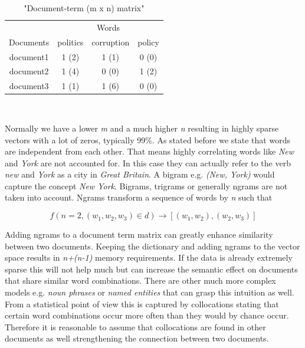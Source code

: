     \begin{table}[h!]
      \centering
      \begin{tabular}{c|c|c|c}
        \multicolumn{1}{r|}{} & \multicolumn{3}{c}{Words} \\
        \cline{1-4}
        Documents &   politics &   corruption &  policy  \\
        \hline
        document1 &    1 (2)   &     1 (1)    &   0 (0)  \\
        document2 &    1 (4)   &     0 (0)    &   1 (2)  \\
        document3 &    1 (1)   &     1 (6)    &   0 (0)  \\
      \end{tabular}\\
      \caption{"Document-term (m x n) matrix"}
    \end{table}

    Normally we have a lower \emph{m} and a much higher \emph{n} resulting in highly sparse vectors with a lot of zeros, typically 99\%. As stated before we state that words are independent from each other. That means highly correlating words like \emph{New} and \emph{York} are not accounted for. In this case they can actually refer to the verb \emph{new} and \emph{York} as a city in \emph{Great Britain}. A bigram e.g. \emph{(New, York)} would capture the concept \emph{New York}. Bigrams, trigrams or generally ngrams are not taken into account. Ngrams transform a sequence of words by \emph{n} such that 

      \begin{equation}
        f(n = 2, (w_1, w_2, w_3) \in d) \to [(w_1, w_2),(w_2,w_3)]
      \end{equation}

    Adding ngrams to a document term matrix can greatly enhance similarity between two documents. Keeping the dictionary and adding ngrams to the vector space results in \emph{n+(n-1)} memory requirements. If the data is already extremely sparse this will not help much but can increase the semantic effect on documents that share similar word combinations. There are other much more complex models e.g. \emph{noun phrases} or \emph{named entities} that can grasp this intuition as well. From a statistical point of view this is captured by collocations stating that certain word combinations occur more often than they would by chance occur. Therefore it is reasonable to assume that collocations are found in other documents as well strengthening the connection between two documents.

